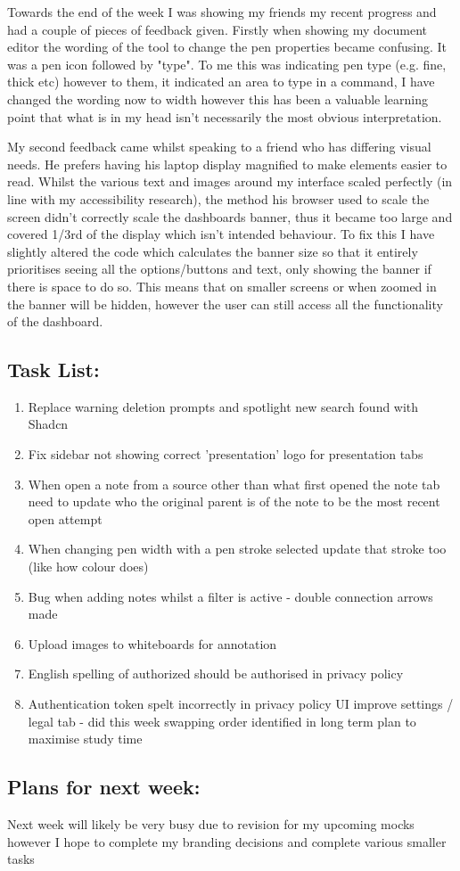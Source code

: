 Towards the end of the week I was showing my friends my recent progress and had a couple of pieces of feedback given. Firstly when showing my document editor the wording of the tool to change the pen properties became confusing. It was a pen icon followed by "type". To me this was indicating pen type (e.g. fine, thick etc) however to them, it indicated an area to type in a command, I have changed the wording now to width however this has been a valuable learning point that what is in my head isn't necessarily the most obvious interpretation. 

My second feedback came whilst speaking to a friend who has differing visual needs. He prefers having his laptop display magnified to make elements easier to read. Whilst the various text and images around my interface scaled perfectly (in line with my accessibility research), the method his browser used to scale the screen didn't correctly scale the dashboards banner, thus it became too large and covered 1/3rd of the display which isn't intended behaviour. To fix this I have slightly altered the code which calculates the banner size so that it entirely prioritises seeing all the options/buttons and text, only showing the banner if there is space to do so. This means that on smaller screens or when zoomed in the banner will be hidden, however the user can still access all the functionality of the dashboard.

\subsection*{Task List:}
\begin{enumerate}
    \item Replace warning deletion prompts and spotlight new search found with Shadcn 
    \item Fix sidebar not showing correct 'presentation' logo for presentation tabs 
    \item When open a note from a source other than what first opened the note tab need to update who the original parent is of the note to be the most recent open attempt 
    \item When changing pen width with a pen stroke selected update that stroke too (like how colour does) 
    \item Bug when adding notes whilst a filter is active - double connection arrows made 
    \item Upload images to whiteboards for annotation 
    \item English spelling of authorized should be authorised in privacy policy
    \item Authentication token spelt incorrectly in privacy policy 
    UI improve settings / legal tab - did this week swapping order identified in long term plan to maximise study time 
\end{enumerate}

\subsection*{Plans for next week:}
Next week will likely be very busy due to revision for my upcoming mocks however I hope to complete my branding decisions and complete various smaller tasks
